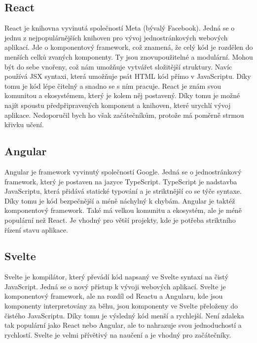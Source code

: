 \subsection*{React}
\label{subsec:react}

React je knihovna vyvinutá společností Meta (bývalý Facebook). Jedná se o jednu z nejpopulárnějších knihoven pro vývoj jednostránkových webových aplikací. Jde o komponentový framework, což znamená, že celý kód je rozdělen do menších celků zvaných komponenty. Ty jsou znovupoužitelné a modulární. Mohou být do sebe vnořeny, což nám umožňuje vytvářet složitější struktury. Navíc používá JSX syntaxi, která umožňuje psát HTML kód přímo v JavaScriptu. Díky tomu je kód lépe čitelný a snadno se s ním pracuje. React je znám svou komunitou a ekosystémem, který je kolem něj postavený. Díky tomu je možné najít spoustu předpřipravených komponent a knihoven, které urychlí vývoj aplikace. Nedoporučil bych ho však začátečníkům, protože má poměrně strmou křivku učení.

\subsection*{Angular}
\label{subsec:angular}

Angular je framework vyvinutý společností Google. Jedná se o jednostránkový framework, který je postaven na jazyce TypeScript. TypeScript je nadstavba JavaScriptu, která přidává statické typování a je striktnější co se týče syntaxe. Díky tomu je kód bezpečnější a méně náchylný k chybám. Angular je taktéž komponentový framework. Také má velkou komunitu a ekosystém, ale je méně populární než React. Je vhodný pro větší projekty, kde je potřeba striktního řízení stavu aplikace.

\pagebreak
\subsection*{Svelte}
\label{subsec:svelte}

Svelte je kompilátor, který převádí kód napsaný ve Svelte syntaxi na čistý JavaScript. Jedná se o nový přístup k vývoji webových aplikací. Svelte je komponentový framework, ale na rozdíl od Reactu a Angularu, kde jsou komponenty interpretovány za běhu, jsou komponenty ve Svelte přeloženy do čistého JavaScriptu. Díky tomu je výsledný kód menší a rychlejší. Není zdaleka tak populární jako React nebo Angular, ale to nahrazuje svou jednoduchostí a rychlostí. Svelte je velmi přívětivý na naučení a je vhodný pro začátečníky.


